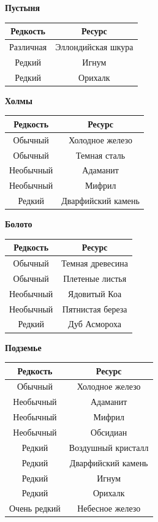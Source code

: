 \documentclass[a4paper, 9pt, twocolumn]{book}
\begin{document}
\begin{minipage}{0.45\linewidth}
	 	\medspace
	 	
	 	\textbf{Пустыня}
	 	
	 	\begin{tabular}{|c|c|}
	 		\hline
	 		\textbf{Редкость} & \textbf{Ресурс} \\
	 		\hline
	 		Различная & Эллондийская шкура \\
	 		\hline
	 		Редкий & Игнум \\
	 		\hline
	 		Редкий & Орихалк  \\
	 		\hline
	 	\end{tabular}
	\end{minipage}
	\begin{minipage}{0.45\linewidth}
		\centering
		\textbf{Холмы}
		
		\begin{tabular}{|c|c|}
			\hline
			\textbf{Редкость} & \textbf{Ресурс} \\
			\hline
			Обычный & Холодное железо \\
			\hline
			Обычный & Темная сталь \\
			\hline
			Необычный & Адаманит \\
			\hline
			Необычный & Мифрил \\
			\hline
			Редкий & Дварфийский камень \\
			\hline
		\end{tabular}
	
		\medspace
		
		\textbf{Болото}
		
		\begin{tabular}{|c|c|}
			\hline
			\textbf{Редкость} & \textbf{Ресурс} \\
			\hline
			Обычный & Темная древесина \\
			\hline
			Обычный & Плетеные листья \\
			\hline
			Необычный & Ядовитый Коа \\
			\hline
			Необычный & Пятнистая береза \\
			\hline
			Редкий & Дуб Асмороха \\
			\hline
		\end{tabular}
	
		\medspace
		
		\textbf{Подземье}
		
		\begin{tabular}{|c|c|}
			\hline
			\textbf{Редкость} & \textbf{Ресурс} \\
			\hline
			Обычный & Холодное железо \\
			\hline
			Необычный & Адаманит \\
			\hline
			Необычный & Мифрил \\
			\hline
			Необычный & Обсидиан \\
			\hline
			Редкий & Воздушный кристалл \\
			\hline
			Редкий & Дварфийский камень \\
			\hline
			Редкий & Игнум \\
			\hline
			Редкий & Орихалк \\
			\hline
			Очень редкий & Небесное железо \\
			\hline
		\end{tabular}
	

\end{minipage}
\end{document}
